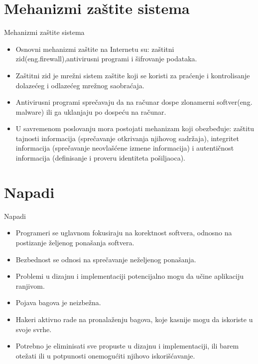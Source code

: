 \documentclass{beamer}
\begin{document}
\section{Mehanizmi zaštite sistema}

\begin{frame}{Mehanizmi zaštite sistema}
  \begin{itemize}
  \item {
   Osnovni mehanizmi zaštite na Internetu su: zaštitni zid(eng.firewall),antivirusni programi i šifrovanje podataka.
   \pause
  }
  \item {
    Zaštitni zid je mrežni sistem zaštite koji se koristi za praćenje i kontrolisanje dolazećeg i odlazećeg mrežnog saobraćaja.
    \pause
  }
  \item {
    Antivirusni programi sprečavaju da na računar dospe zlonamerni softver(eng. malware) ili ga uklanjaju po dospeću na računar.
    \pause
  }
  \item {
    U savremenom poslovanju mora postojati mehanizam koji obezbeđuje: zaštitu tajnosti informacija (sprečavanje otkrivanja njihovog sadržaja), integritet informacija (sprečavanje neovlašćene izmene informacija) i autentičnost informacija (definisanje i proveru identiteta pošiljaoca).
  }
  \end{itemize}
\end{frame}

\section{Napadi}

\begin{frame}{Napadi}
    \begin{itemize}
        \item Programeri se uglavnom fokusiraju na korektnost softvera, odnosno na postizanje željenog ponašanja softvera. \pause
        \item Bezbednost se odnosi na sprečavanje neželjenog ponašanja. \pause
        \item Problemi u dizajnu i implementaciji potencijalno mogu da učine aplikaciju ranjivom. \pause
        \item Pojava bagova je neizbežna. \pause
        \item Hakeri aktivno rade na pronalaženju bagova, koje kasnije mogu da iskoriste u svoje svrhe. \pause
        \item Potrebno je eliminisati sve propuste u dizajnu i implementaciji, ili barem otežati ili u potpunosti onemogućiti njihovo iskorišćavanje.
    \end{itemize}
\end{frame}
\end{document}
